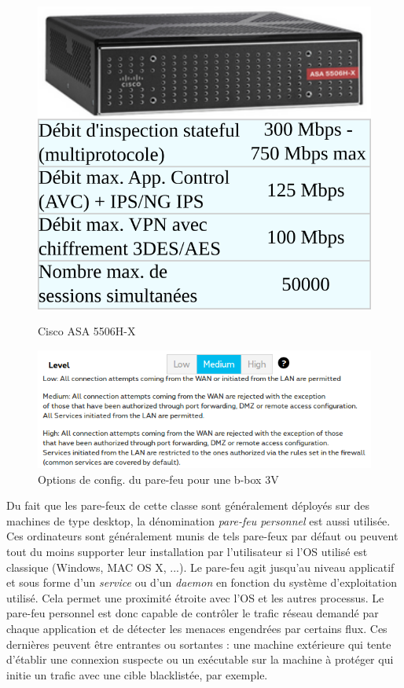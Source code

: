 \documentclass[]{article}
\newcommand{\minit}[1]{\noindent{\small\textbf{ \underline{#1}}}\vspace{0.2cm}}
\begin{document}
\begin{figure}[!ht]
\centering
\begin{minipage}{.4\textwidth}
  \centering
  \includegraphics[width=.6\linewidth]{desc_cisco_ASA-5506H-X.png}
  \caption{Cisco ASA 5506H-X}
  \label{cisco_FW}
\end{minipage}%
\begin{minipage}{.6\textwidth}
  \centering
  \includegraphics[width=1.0\linewidth]{proximus_FW.png}
  \caption{Options de config. du pare-feu pour une b-box 3V}
  \label{proxi_FW}
\end{minipage}
\end{figure}


\minit{Les pare-feux niveau hôte}\label{host_fw}

\par Du fait que les pare-feux de cette classe sont généralement déployés sur des machines de type desktop, la dénomination \textit{pare-feu personnel} est aussi utilisée. Ces ordinateurs sont généralement munis de tels pare-feux par défaut ou peuvent tout du moins supporter leur installation par l'utilisateur si l'OS utilisé est classique (Windows, MAC OS X, ...). Le pare-feu agit jusqu'au niveau applicatif \cite{Kokko2017} et sous forme d'un \textit{service} ou d'un \textit{daemon} en fonction du système d'exploitation utilisé. Cela permet une proximité étroite avec l'OS et les autres processus. Le pare-feu personnel est donc capable de contrôler le trafic réseau demandé par chaque application et de détecter les menaces engendrées par certains flux. Ces dernières peuvent être entrantes ou sortantes : une machine extérieure qui tente d'établir une connexion suspecte ou un exécutable sur la machine à protéger qui initie un trafic avec une cible blacklistée, par exemple.\\
\end{document}
